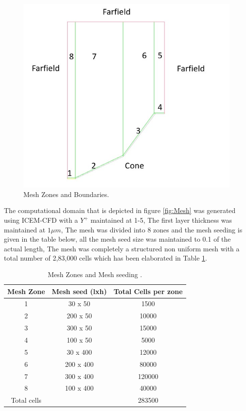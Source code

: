 \begin{figure}[ht]
\centering
  \includegraphics[width=0.55\linewidth]{images/mesh_zones.jpg}
  \caption{ Mesh Zones and Boundaries.}
  \label{fig:mesh_zones}
\end{figure}

The computational domain that is depicted in figure \ref{fig:Mesh} was generated using ICEM-CFD with a \( Y^+ \) maintained at 1-5, The first layer thickness was maintained at \(1 \mu m\), The mesh was divided into 8 zones and the mesh seeding is given in the table below, all the mesh seed size was maintained to 0.1 of the actual length, The mesh was completely a structured non uniform mesh with a total number of 2,83,000 cells which has been elaborated in Table \ref{fig:mesh_seeding}.

\begin{table}[h!]
\centering
 \begin{tabular}{||c c c||} 
 \hline
 Mesh Zone & Mesh seed (lxh) & Total Cells per zone \\ [0.5ex] 
 \hline\hline
 1 & 30 x 50 & 1500  \\
 2 & 200 x 50 & 10000  \\
 3 & 300 x 50 & 15000  \\
 4 & 100 x 50 & 5000   \\
 5 & 30 x 400 & 12000  \\
  6 & 200 x 400 & 80000  \\
  7 & 300 x 400 & 120000  \\
8 & 100 x 400 & 40000  \\
 \hline
 Total cells & &       283500\\
 \hline

 \end{tabular}
  \caption{ Mesh Zones and Mesh seeding .}
 \label{fig:mesh_seeding}
\end{table}

